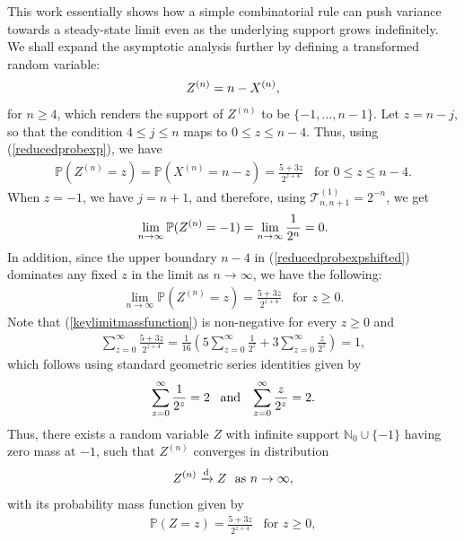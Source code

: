 \documentclass[a4paper,12pt]{article}
\def\P{\mathbb{P}}
\def\N{\mathbb{N}}
\def\T{\mathcal{T}}
\begin{document}
This work essentially shows how a simple combinatorial rule can push variance towards a steady-state limit even as the underlying support grows indefinitely. We shall expand the asymptotic analysis further by defining a transformed random variable:
\begin{align}
Z^{(n)} = n - X^{(n)}, \notag
\end{align}
for $n\geq 4$, which renders the support of $Z^{(n)}$ to be $\{-1,\ldots,n-1\}$. Let $z=n-j$, so that the condition $4\leq j \leq n$ maps to $0\leq z \leq n-4$. Thus, using (\ref{reducedprobexp}), we have
\begin{align}
\P(Z^{(n)} = z) = \P(X^{(n)} = n - z) = \frac{5 + 3z}{2^{z+4}} \,\,\,\,\, \text{for $0\leq z \leq n-4$}. \label{reducedprobexpshifted}
\end{align}
When $z=-1$, we have $j=n+1$, and therefore, using $\T^{(1)}_{n,n+1} = 2^{-n}$, we get
\begin{align}
\lim_{n\rightarrow\infty}\P(Z^{(n)} = -1) = \lim_{n\rightarrow\infty}\frac{1}{2^n} = 0. \notag
\end{align}
In addition, since the upper boundary $n-4$ in (\ref{reducedprobexpshifted}) dominates any fixed $z$ in the limit as $n\rightarrow\infty$, we have the following:
\begin{align}
\lim_{n\rightarrow\infty}\P(Z^{(n)} = z) = \frac{5 + 3z}{2^{z+4}} \,\,\,\,\, \text{for $z\geq 0$}. \label{keylimitmassfunction}
\end{align}
Note that (\ref{keylimitmassfunction}) is non-negative for every $z\geq 0$ and
\begin{align}
\sum_{z=0}^{\infty} \frac{5 + 3z}{2^{z+4}} = \frac{1}{16}\left(5 \sum_{z=0}^{\infty} \frac{1}{2^z} + 3\sum_{z=0}^{\infty} \frac{z}{2^z} \right) = 1, \label{keylimitmassfunctionsumidentity}
\end{align}
which follows using standard geometric series identities given by
\begin{align}
\sum_{z=0}^{\infty} \frac{1}{2^z} = 2 \,\,\,\,\, \text{and} \,\,\,\,\, \sum_{z=0}^{\infty} \frac{z}{2^z} = 2. \notag
\end{align}
Thus, there exists a random variable $Z$ with infinite support $\N_0 \cup \{-1\}$ having zero mass at $-1$, such that $Z^{(n)}$ converges in distribution
\begin{align}
Z^{(n)} \xrightarrow{\text{d}} Z \,\,\,\, \text{as $n\rightarrow\infty$}, \notag
\end{align}
with its probability mass function given by
\begin{align}
\P(Z = z) = \frac{5 + 3z}{2^{z+4}} \,\,\,\,\, \text{for $z\geq 0$}, \label{limitrandomvariable}
\end{align}
\end{document}
